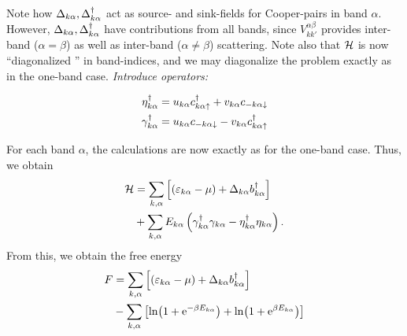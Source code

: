 Note how $\Delta_{k\alpha}, \Delta_{k\alpha}^{\dagger}$ act as source- and sink-fields for Cooper-pairs in band $\alpha$. However,  $\Delta_{k\alpha}, \Delta_{k\alpha}^{\dagger}$ have contributions from all bands, since $V_{kk'}^{\alpha\beta}$ provides inter-band ($\alpha = \beta$) as well as inter-band ($\alpha\ne\beta$) scattering. Note also that $\mathcal{H}$ is now ``diagonalized '' in band-indices, and we may diagonalize the problem exactly as in the one-band case. 
\emph{Introduce operators:}
\begin{tcolorbox}
	\begin{equation}
		\begin{aligned}
			\eta_{k\alpha}^{\dagger} &= u_{k\alpha}c^{\dagger}_{k\alpha\uparrow} + v_{k\alpha}c_{-k\alpha\downarrow} \\
			\gamma_{k\alpha}^{\dagger} &= u_{k\alpha}c_{-k\alpha\downarrow} -v_{k\alpha} c^{\dagger}_{k\alpha\uparrow}
		\end{aligned}
	\end{equation}
\end{tcolorbox}
For each band $\alpha$, the calculations are now exactly as for the one-band case. Thus, we obtain
\begin{equation}
	\begin{aligned}
	\mathcal{H} &= \sum_{k,\alpha}\left [(\varepsilon_{k\alpha}-\mu) + \Delta_{k\alpha}b_{k\alpha}^{\dagger}\right ] \\& + 
	\sum_{k,\alpha}E_{k\alpha}\left (\gamma_{k\alpha}^{\dagger}\gamma_{k\alpha} - \eta_{k\alpha}^{\dagger}\eta_{k\alpha}\right ).
	\end{aligned}
\end{equation}
From this, we obtain the free energy
\begin{equation}
	\begin{aligned}
		F &= \sum_{k,\alpha}\left [(\varepsilon_{k\alpha}-\mu)+ \Delta_{k\alpha}b_{k\alpha}^{\dagger}\right ]  \\
		&-\sum_{k,\alpha}\left [\ln(1+\mathrm{e}^{-\beta E_{k\alpha}}) +\ln(1 + \mathrm{e}^{\beta E_{k\alpha}})\right ]
	\end{aligned}
\end{equation}

